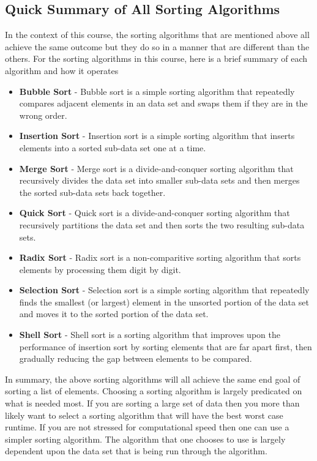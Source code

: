 \documentclass[a4paper,9pt]{article}
\begin{document}
\subsection*{Quick Summary of All Sorting Algorithms}

In the context of this course, the sorting algorithms that are mentioned above all achieve the same outcome but they do so in a manner that are different than the others. For the sorting algorithms in this course, here is a brief summary of each algorithm and how it operates

\begin{itemize}
    \item \textbf{Bubble Sort} - Bubble sort is a simple sorting algorithm that repeatedly compares adjacent elements in an data set and swaps them if they are in the wrong order.
    \item \textbf{Insertion Sort} - Insertion sort is a simple sorting algorithm that inserts elements into a sorted sub-data set one at a time.
    \item \textbf{Merge Sort} - Merge sort is a divide-and-conquer sorting algorithm that recursively divides the data set into smaller sub-data sets and then merges the sorted sub-data sets back together.
    \item \textbf{Quick Sort} - Quick sort is a divide-and-conquer sorting algorithm that recursively partitions the data set and then sorts the two resulting sub-data sets.
    \item \textbf{Radix Sort} - Radix sort is a non-comparitive sorting algorithm that sorts elements by processing them digit by digit.
    \item \textbf{Selection Sort} - Selection sort is a simple sorting algorithm that repeatedly finds the smallest (or largest) element in the unsorted portion of the data set and moves it to the sorted portion of the data set.
    \item \textbf{Shell Sort} - Shell sort is a sorting algorithm that improves upon the performance of insertion sort by sorting elements that are far apart first, then gradually reducing the gap between elements to be compared.
\end{itemize}

\noindent In summary, the above sorting algorithms will all achieve the same end goal of sorting a list of elements. Choosing a sorting algorithm is largely predicated on what is needed most. If you are sorting a large set of data then you more than likely want to select a sorting algorithm that will have the best worst case runtime. If you are not stressed for computational speed then one can use a simpler sorting algorithm. The algorithm that one chooses to use is largely dependent upon the data set that is being run through the algorithm.
\end{document}
